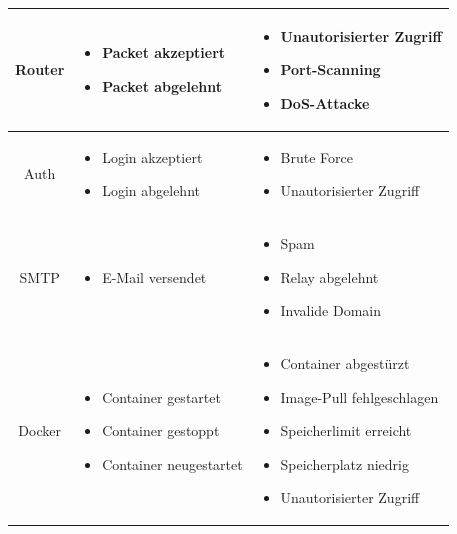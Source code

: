 \documentclass[a4paper,12pt]{report}
\begin{document}
\begin{table}[h!]
\begin{tabular}{|c|p{6cm}|p{6cm}|}
            \textnormal{Router} &
            \begin{itemize}
                \item Packet akzeptiert
                \item Packet abgelehnt
            \end{itemize} &
            \begin{itemize}
                \item Unautorisierter Zugriff
                \item Port-Scanning
                \item DoS-Attacke
            \end{itemize} \\ \hline

            \textnormal{Auth} &
            \begin{itemize}
                \item Login akzeptiert
                \item Login abgelehnt
            \end{itemize} &
            \begin{itemize}
                \item Brute Force
                \item Unautorisierter Zugriff
            \end{itemize} \\ \hline

            \textnormal{SMTP} &
            \begin{itemize}
                \item E-Mail versendet
            \end{itemize} &
            \begin{itemize}
                \item Spam
                \item Relay abgelehnt
                \item Invalide Domain
            \end{itemize} \\ \hline

            \textnormal{Docker} &
            \begin{itemize}
                \item Container gestartet
                \item Container gestoppt
                \item Container neugestartet
            \end{itemize} &
            \begin{itemize}
                \item Container abgestürzt
                \item Image-Pull fehlgeschlagen
                \item Speicherlimit erreicht
                \item Speicherplatz niedrig
                \item Unautorisierter Zugriff
            \end{itemize} \\ \hline


\end{tabular}
\end{table}
\end{document}
